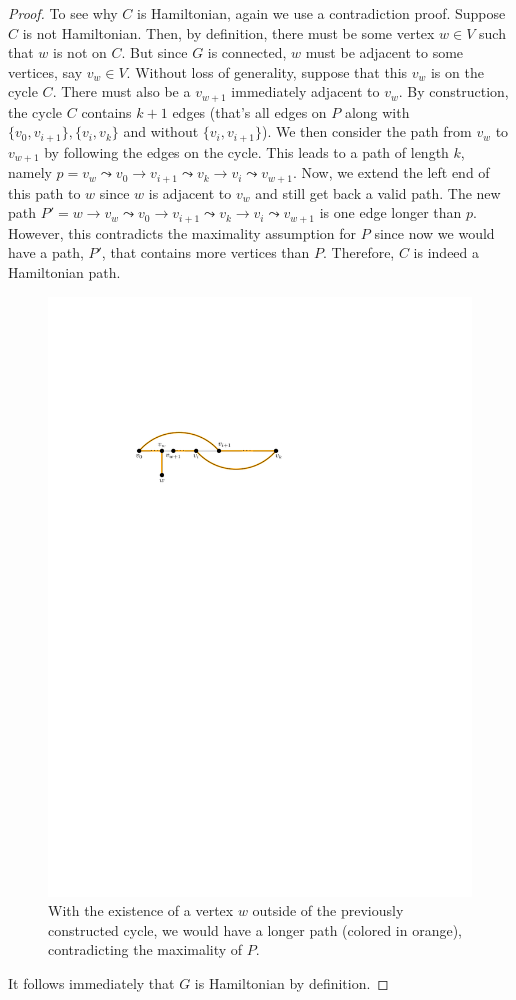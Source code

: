 \begin{proof}
    To see why $C$ is Hamiltonian, again we use a contradiction proof. Suppose $C$ is not Hamiltonian. Then, by definition, there must be some vertex $w \in V$ such that $w$ is not on $C$. But since $G$ is connected, $w$ must be adjacent to some vertices, say $v_w \in V$. Without loss of generality, suppose that this $v_w$ is on the cycle $C$. There must also be a $v_{w+1}$ immediately adjacent to $v_w$. By construction, the cycle $C$ contains $k+1$ edges (that's all edges on $P$ along with $\{v_0,v_{i+1}\}, \{v_i,v_k\}$ and without $\{v_i,v_{i+1}\}$). We then consider the path from $v_w$ to $v_{w+1}$ by following the edges on the cycle. This leads to a path of length $k$, namely $p = v_w \leadsto v_0 \to v_{i+1} \leadsto v_k \to v_i \leadsto v_{w+1}$. Now, we extend the left end of this path to $w$ since $w$ is adjacent to $v_w$ and still get back a valid path. The new path $P' = w \to v_w \leadsto v_0 \to v_{i+1} \leadsto v_k \to v_i \leadsto v_{w+1}$ is one edge longer than $p$. However, this contradicts the maximality assumption for $P$ since now we would have a path, $P'$, that contains more vertices than $P$. Therefore, $C$ is indeed a Hamiltonian path.

    \begin{figure}[htbp]
        \centering
        \includegraphics[width=0.4\linewidth]{figures/dirac-thm-longer-path-contradiction.pdf}
        \caption{With the existence of a vertex $w$ outside of the previously constructed cycle, we would have a longer path (colored in orange), contradicting the maximality of $P$.}
        \label{fig:dirac-thm-path-contradiction}
    \end{figure}

    It follows immediately that $G$ is Hamiltonian by definition.
\end{proof}